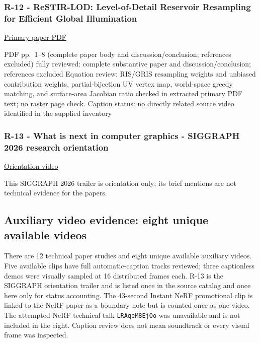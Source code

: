 \subsubsection{R-12 - ReSTIR-LOD: Level-of-Detail Reservoir Resampling for Efficient Global Illumination}\label{04-visual-computing-ii-ch036-r-12---restir-lod-level-of-detail-reservoir-resampling-for-efficient-global-illumination}

\href{https://research.nvidia.com/labs/rtr/publication/wang2026levelOfDetail/wang2026levelOfDetail.pdf}{Primary paper PDF}

PDF pp.~1--8 (complete paper body and discussion/conclusion; references excluded) fully reviewed: complete substantive paper and discussion/conclusion; references excluded Equation review: RIS/GRIS resampling weights and unbiased contribution weights, partial-bijection UV vertex map, world-space greedy matching, and surface-area Jacobian ratio checked in extracted primary PDF text; no raster page check. Caption status: no directly related source video identified in the supplied inventory

\subsubsection{R-13 - What is next in computer graphics - SIGGRAPH 2026 research orientation}\label{04-visual-computing-ii-ch036-r-13---what-is-next-in-computer-graphics---siggraph-2026-research-orientation}

\href{https://www.youtube.com/watch?v=sIcGH3M5yPc}{Orientation video}

This SIGGRAPH 2026 trailer is orientation only; its brief mentions are not technical evidence for the papers.

\subsection{Auxiliary video evidence: eight unique available videos}\label{04-visual-computing-ii-ch036-auxiliary-video-evidence-eight-unique-available-videos}

There are 12 technical paper studies and eight unique available auxiliary videos. Five available clips have full automatic-caption tracks reviewed; three captionless demos were visually sampled at 16 distributed frames each. R-13 is the SIGGRAPH orientation trailer and is listed once in the source catalog and once here only for status accounting. The 43-second Instant NeRF promotional clip is linked to the NeRF paper as a boundary note but is counted once as one video. The attempted NeRF technical talk \texttt{LRAqeM8EjOo} was unavailable and is not included in the eight. Caption review does not mean soundtrack or every visual frame was inspected.


